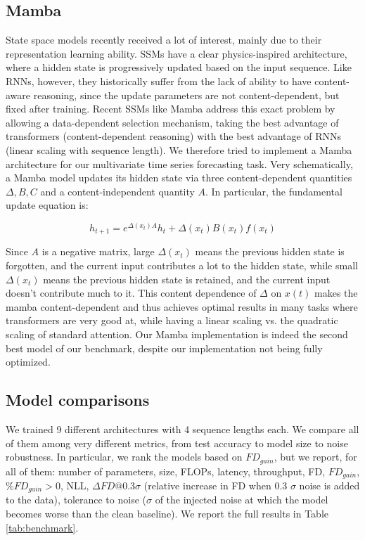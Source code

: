 \documentclass[
reprint,
aps,
prd,
superscriptaddress,
nofootinbib
]{revtex4-2}
\begin{document}
\subsection{Mamba}
State space models recently received a lot of interest, mainly due to their representation learning ability. SSMs have a clear physics-inspired architecture, where a hidden state is progressively updated based on the input sequence. Like RNNs, however, they historically suffer from the lack of ability to have content-aware reasoning, since the update parameters are not content-dependent, but fixed after training. Recent SSMs like Mamba address this exact problem by allowing a data-dependent selection mechanism, taking the best advantage of transformers (content-dependent reasoning) with the best advantage of RNNs (linear scaling with sequence length). We therefore tried to implement a Mamba architecture for our multivariate time series forecasting task. 
Very schematically, a Mamba model updates its hidden state via three content-dependent quantities $\Delta, B, C$ and a content-independent quantity $A$. In particular, the fundamental update equation is:

\begin{equation}
    h_{t+1} = e^{\Delta(x_t) A} h_t + \Delta(x_t)B(x_t) f(x_t)
\end{equation}

Since $A$ is a negative matrix, large $\Delta(x_t)$ means the previous hidden state is forgotten, and the current input contributes a lot to the hidden state, while small $\Delta(x_t)$ means the previous hidden state is retained, and the current input doesn't contribute much to it. This content dependence of $\Delta$ on $x(t)$ makes the mamba content-dependent and thus achieves optimal results in many tasks where transformers are very good at, while having a linear scaling vs. the quadratic scaling of standard attention. Our Mamba implementation is indeed the second best model of our benchmark, despite our implementation not being fully optimized.


\subsection{Model comparisons}
We trained 9 different architectures with 4 sequence lengths each. We compare all of them among very different metrics, from test accuracy to model size to noise robustness. In particular, we rank the models based on $FD_{gain}$, but we report, for all of them:  number of parameters, size, FLOPs, latency, throughput, FD,  $FD_{gain}$,  $\%FD_{gain}>0$, NLL, $ \Delta FD@0.3\sigma$ (relative increase in FD when 0.3 $\sigma$ noise is added to the data), tolerance to noise ($\sigma$ of the injected noise at which the model becomes worse than the clean baseline). We report the full results in Table \ref{tab:benchmark}.
\end{document}
